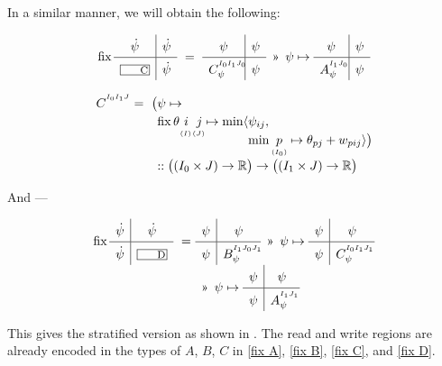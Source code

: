 \medskip\noindent
In a similar manner, we will obtain the following:

\begin{equation}
  \fix\quadrants{\dot\psi}{\dot\psi}{\lbox C}{\dot\psi} ~=~
    \quadrants{\psi}{\psi}{C^{^{I_0I_1J_0}}_\psi\!\!\!\!}{\psi} ~\applt~
    \psi\mapsto\quadrants{\psi}{\psi}{A^{^{I_1J_0}}_\psi\!\!\!}{\psi}
  \label{fix C}
\end{equation}

\begin{equation}
  \renewcommand\arraystretch{1.2}
  \begin{array}{@{}l @{} l @{\!} c @{} c @{} l @{} l@{}}
  C^{^{I_0I_1J}} =~ \big( & \psi\mapsto \\
      & \fix
      \theta & i & j & \mapsto\min\langle & \psi_{ij}, \\
           & & ^{^{(I)}} & ^{^{(J)}} &
                                          & \min \vtyped p {I_0} \mapsto\theta_{pj}+w_{pij} \rangle\big) \\
      & \lspan5{:: \big((I_0\times J)\to\R\big) \to \big((I_1\times J)\to\R\big)}
  \end{array}
\end{equation}

\medskip\noindent
And ---

\begin{equation}
  \begin{array}{@{} l @{} l @{}}
    \fix\quadrants{\dot\psi}{\dot\psi}{\dot\psi}{\lbox D} ~=~ &
      \quadrants{\psi}{\psi}{\psi}{B^{^{I_1J_0J_1}}_\psi\!\!\!\!} ~\applt~
      \psi\mapsto\quadrants{\psi}{\psi}{\psi}{C^{^{I_0I_1J_1}}_\psi\!\!\!} \\
    &
       ~\applt~ \psi\mapsto\quadrants{\psi}{\psi}{\psi}{A^{^{I_1J_1}}_\psi\!\!\!}
  \end{array}
  \label{fix D}
\end{equation}

This gives the stratified version as shown in .
The read and write regions are already encoded in the types of $A$, $B$, $C$ in 
\eqref{fix A}, \eqref{fix B}, \eqref{fix C}, and \eqref{fix D}.


